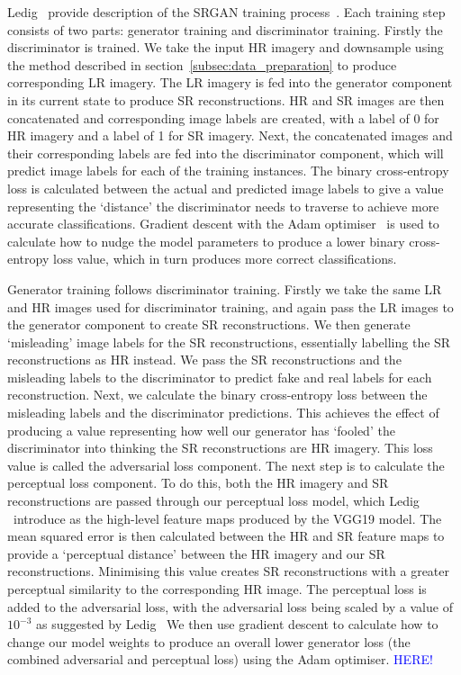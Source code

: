 Ledig \etal\ provide description of the SRGAN training process~\cite{srgan}. Each training step consists of two parts: generator training and discriminator training. Firstly the discriminator is trained. We take the input HR imagery and downsample using the method described in section~\ref{subsec:data_preparation} to produce corresponding LR imagery. The LR imagery is fed into the generator component in its current state to produce SR reconstructions. HR and SR images are then concatenated and corresponding image labels are created, with a label of 0 for HR imagery and a label of 1 for SR imagery. Next, the concatenated images and their corresponding labels are fed into the discriminator component, which will predict image labels for each of the training instances. The binary cross-entropy loss is calculated between the actual and predicted image labels to give a value representing the `distance' the discriminator needs to traverse to achieve more accurate classifications. Gradient descent with the Adam optimiser~\cite{adamOptimiser} is used to calculate how to nudge the model parameters to produce a lower binary cross-entropy loss value, which in turn produces more correct classifications.

Generator training follows discriminator training. Firstly we take the same LR and HR images used for discriminator training, and again pass the LR images to the generator component to create SR reconstructions. We then generate `misleading' image labels for the SR reconstructions, essentially labelling the SR reconstructions as HR instead. We pass the SR reconstructions and the misleading labels to the discriminator to predict fake and real labels for each reconstruction. Next, we calculate the binary cross-entropy loss between the misleading labels and the discriminator predictions. This achieves the effect of producing a value representing how well our generator has `fooled' the discriminator into thinking the SR reconstructions are HR imagery. This loss value is called the adversarial loss component. The next step is to calculate the perceptual loss component. To do this, both the HR imagery and SR reconstructions are passed through our perceptual loss model, which Ledig \etal\ introduce as the high-level feature maps produced by the VGG19 model. The mean squared error is then calculated between the HR and SR feature maps to provide a `perceptual distance' between the HR imagery and our SR reconstructions. Minimising this value creates SR reconstructions with a greater perceptual similarity to the corresponding HR image. The perceptual loss is added to the adversarial loss, with the adversarial loss being scaled by a value of $10^{-3}$ as suggested by Ledig \etal\ We then use gradient descent to calculate how to change our model weights to produce an overall lower generator loss (the combined adversarial and perceptual loss) using the Adam optimiser. \textcolor{blue}{HERE!}

